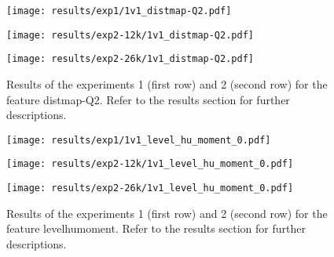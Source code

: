 \begin{figure}[h!]
	\centering
	\begin{minipage}{0.4\linewidth}
		\texttt{[image: results/exp1/1v1\_distmap-Q2.pdf]}
	\end{minipage}
	
	\begin{minipage}{0.4\linewidth}
		\texttt{[image: results/exp2-12k/1v1\_distmap-Q2.pdf]}
	\end{minipage}
	\begin{minipage}{0.4\linewidth}
		\texttt{[image: results/exp2-26k/1v1\_distmap-Q2.pdf]}
	\end{minipage}
	
	\caption[ Results: Feature distmap-Q2]{ Results of the experiments 1 (first row) and 2 (second row) for the feature distmap-Q2. Refer to the results section for further descriptions. }
	\label{fig:appendix_distmap-Q2}
\end{figure}
\newpage 


\begin{figure}[h!]
	\centering
	\begin{minipage}{0.4\linewidth}
		\texttt{[image: results/exp1/1v1\_level\_hu\_moment\_0.pdf]}
	\end{minipage}
	
	\begin{minipage}{0.4\linewidth}
		\texttt{[image: results/exp2-12k/1v1\_level\_hu\_moment\_0.pdf]}
	\end{minipage}
	\begin{minipage}{0.4\linewidth}
		\texttt{[image: results/exp2-26k/1v1\_level\_hu\_moment\_0.pdf]}
	\end{minipage}
	
	\caption[ Results: Feature level\textunderscore hu\textunderscore moment]{ Results of the experiments 1 (first row) and 2 (second row) for the feature level\textunderscore hu\textunderscore moment. Refer to the results section for further descriptions. }
	\label{fig:appendix_level_hu_moment_0}
\end{figure}

